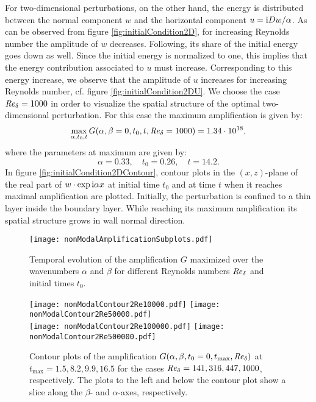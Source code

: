 \documentclass{jfm}
\newcommand\be{\begin{equation}}
\newcommand\ee{\end{equation}}
\newcommand\Rey{\mbox{\textit{Re}}}  %
\begin{document}
For two-dimensional perturbations, on the other hand, the energy
is distributed between the normal component
$ w $ and the horizontal component $ u = {\rm i} D w/\alpha $.
As can be observed from figure \ref{fig:initialCondition2D},
for increasing Reynolds number the amplitude of $ w $
decreases. Following, its share of the initial energy
goes down as well. Since the initial energy is normalized to one, this
implies that the energy contribution associated to $ u $
must increase. Corresponding to this energy increase, we observe
that the amplitude of $ u $ increases for increasing Reynolds number,
cf. figure \ref{fig:initialCondition2DU}.
We choose the case $ \Rey_\delta = 1000 $ in order to visualize
the spatial structure of the optimal two-dimensional perturbation.
For this case the maximum amplification is given by:
\be
\max_{\alpha,t_0,t} G(\alpha,\beta=0,t_0,t,\Rey_\delta = 1000 ) = 1.34 \cdot 10^{18},
\ee
where the parameters at maximum are given by:
\be
\alpha = 0.33, \quad t_0 = 0.26, \quad t = 14.2. 
\ee
In figure \ref{fig:initialCondition2DContour}, contour plots in
the $(x,z)$-plane of the real part of
$ w \cdot \exp {\rm i} \alpha x $ at initial time $ t_0 $ and
at time $ t $ when it reaches maximal amplification are plotted.
Initially, the perturbation is confined to a thin layer inside the boundary
layer. While reaching its maximum amplification its spatial structure
grows in wall normal direction. 

\begin{sidewaysfigure}%
  \vspace*{13cm}
  \centering
  \texttt{[image: nonModalAmplificationSubplots.pdf]}\\
  \caption{Temporal evolution of the amplification $ G $ maximized 
    over the wavenumbers $ \alpha $ and $ \beta $ for different
    Reynolds numbers $ \Rey_\delta $ and initial times $ t_0 $.}
  \label{fig:temporalEvolution}
\end{sidewaysfigure}

\begin{sidewaysfigure}
  \vspace*{13cm}
  \newcommand{\scl}{0.42}
  \centering
  \texttt{[image: nonModalContour2Re10000.pdf]}
  \texttt{[image: nonModalContour2Re50000.pdf]}\\
  \texttt{[image: nonModalContour2Re100000.pdf]}
  \texttt{[image: nonModalContour2Re500000.pdf]}
  \caption{Contour plots of the amplification 
    $ G(\alpha,\beta,t_0 = 0,t_{\max} , \Rey_\delta )$ at $ t_{\max} = 1.5, 8.2 , 9.9 , 16.5 $
    for the cases $ \Rey_\delta = 141, 316, 447 , 1000 $, respectively. The plots to the left and below the contour plot show a slice along the $ \beta $- and
$ \alpha $-axes, respectively.}
\label{fig:contour}
\end{sidewaysfigure}
\end{document}
